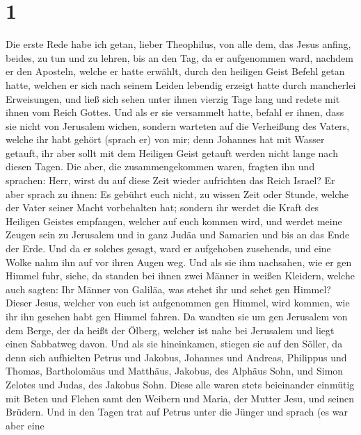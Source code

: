 \hypertarget{section}{%
\section{1}\label{section}}

 Die erste Rede habe ich getan, lieber Theophilus, von alle
dem, das Jesus anfing, beides, zu tun und zu lehren,  bis an
den Tag, da er aufgenommen ward, nachdem er den Aposteln, welche er
hatte erwählt, durch den heiligen Geist Befehl getan hatte, 
welchen er sich nach seinem Leiden lebendig erzeigt hatte durch
mancherlei Erweisungen, und ließ sich sehen unter ihnen vierzig Tage
lang und redete mit ihnen vom Reich Gottes.  Und als er sie
versammelt hatte, befahl er ihnen, dass sie nicht von Jerusalem wichen,
sondern warteten auf die Verheißung des Vaters, welche ihr habt gehört
(sprach er) von mir;  denn Johannes hat mit Wasser getauft,
ihr aber sollt mit dem Heiligen Geist getauft werden nicht lange nach
diesen Tagen.  Die aber, die zusammengekommen waren, fragten
ihn und sprachen: Herr, wirst du auf diese Zeit wieder aufrichten das
Reich Israel?  Er aber sprach zu ihnen: Es gebührt euch
nicht, zu wissen Zeit oder Stunde, welche der Vater seiner Macht
vorbehalten hat;  sondern ihr werdet die Kraft des Heiligen
Geistes empfangen, welcher auf euch kommen wird, und werdet meine Zeugen
sein zu Jerusalem und in ganz Judäa und Samarien und bis an das Ende der
Erde.  Und da er solches gesagt, ward er aufgehoben
zusehends, und eine Wolke nahm ihn auf vor ihren Augen weg.
 Und als sie ihm nachsahen, wie er gen Himmel fuhr, siehe,
da standen bei ihnen zwei Männer in weißen Kleidern, 
welche auch sagten: Ihr Männer von Galiläa, was stehet ihr und sehet gen
Himmel? Dieser Jesus, welcher von euch ist aufgenommen gen Himmel, wird
kommen, wie ihr ihn gesehen habt gen Himmel fahren.  Da
wandten sie um gen Jerusalem von dem Berge, der da heißt der Ölberg,
welcher ist nahe bei Jerusalem und liegt einen Sabbatweg davon.
 Und als sie hineinkamen, stiegen sie auf den Söller, da
denn sich aufhielten Petrus und Jakobus, Johannes und Andreas, Philippus
und Thomas, Bartholomäus und Matthäus, Jakobus, des Alphäus Sohn, und
Simon Zelotes und Judas, des Jakobus Sohn.  Diese alle
waren stets beieinander einmütig mit Beten und Flehen samt den Weibern
und Maria, der Mutter Jesu, und seinen Brüdern.  Und in den
Tagen trat auf Petrus unter die Jünger und sprach (es war aber eine
